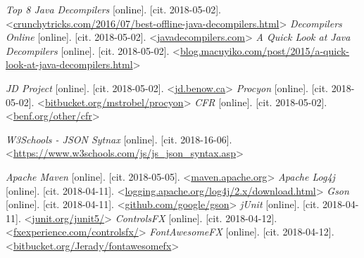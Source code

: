 \begin{thebibliography}{99}
 {\it Top 8 Java Decompilers} [online]. [cit. 2018-05-02]. \textless\url{crunchytricks.com/2016/07/best-offline-java-decompilers.html}\textgreater
{} {\it Decompilers Online} [online]. [cit. 2018-05-02]. \textless\url{javadecompilers.com}\textgreater
{} {\it A Quick Look at Java Decompilers} [online]. [cit. 2018-05-02]. \textless\url{blog.macuyiko.com/post/2015/a-quick-look-at-java-decompilers.html}\textgreater

 {\it JD Project} [online]. [cit. 2018-05-02]. \textless\url{jd.benow.ca}\textgreater
{} {\it Procyon} [online]. [cit. 2018-05-02]. \textless\url{bitbucket.org/mstrobel/procyon}\textgreater
{} {\it CFR} [online]. [cit. 2018-05-02]. \textless\url{benf.org/other/cfr}\textgreater


 {\it W3Schools - JSON Sytnax} [online]. [cit. 2018-16-06]. \textless\url{https://www.w3schools.com/js/js_json_syntax.asp}\textgreater
	

 {\it Apache Maven} [online]. [cit. 2018-05-05]. \textless\url{maven.apache.org}\textgreater
{} {\it Apache Log4j} [online]. [cit. 2018-04-11]. \textless\url{logging.apache.org/log4j/2.x/download.html}\textgreater
{} {\it Gson} [online]. [cit. 2018-04-11]. \textless\url{github.com/google/gson}\textgreater
{} {\it jUnit} [online]. [cit. 2018-04-11]. \textless\url{junit.org/junit5/}\textgreater
{} {\it ControlsFX} [online]. [cit. 2018-04-12]. \textless\url{fxexperience.com/controlsfx/}\textgreater
{} {\it FontAwesomeFX} [online]. [cit. 2018-04-12]. \textless\url{bitbucket.org/Jerady/fontawesomefx}\textgreater




\end{thebibliography}
